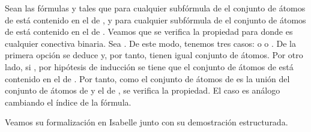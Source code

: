 \begin{isabellebody}
\begin{isamarkuptext}
\begin{demostracion}
  Sean las fórmulas  y  tales que para cualquier subfórmula 
  de  el conjunto de átomos de  está contenido en el de , y
  para cualquier subfórmula  de  el conjunto de átomos de 
  está contenido en el de . Veamos que se verifica la propiedad
  para  donde \isa{{\isacharasterisk}} es cualquier conectiva binaria. 
  Sea . De este modo,
  tenemos tres casos:  o  o 
  . De la primera opción se deduce  y, por
  tanto, tienen igual conjunto de átomos. Por otro lado, si 
  , por hipótesis de inducción se tiene que el conjunto
  de átomos de  está contenido en el de . Por tanto, como el
  conjunto de átomos de  es la unión del conjunto de átomos de 
   y el de , se verifica la propiedad. El caso 
  es análogo cambiando el índice de la fórmula.   
  \end{demostracion}%
\end{isamarkuptext}\isamarkuptrue%
%
\begin{isamarkuptext}%
Veamos su formalización en Isabelle junto con su demostración 
  estructurada.%
\end{isamarkuptext}\isamarkuptrue%
%
\begin{isamarkuptext}%
\end{isamarkuptext}
\end{isabellebody}
